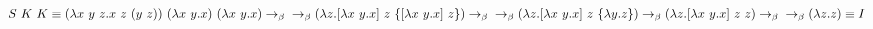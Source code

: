 \documentclass[12pt]{article}
\begin{document}
\large

\noindent
$
S\ K\ K \equiv
(\lambda x\ y\ z.x\ z\ (y\ z))\ (\lambda x\ y.x)\ (\lambda x\ y.x) \rightarrow_\beta \\
\rightarrow_\beta (\lambda z.[\lambda x\ y.x]\ z\ \{[\lambda x\ y.x]\ z\}) \rightarrow_\beta \\
\rightarrow_\beta (\lambda z.[\lambda x\ y.x]\ z\ \{\lambda y.z\}) \rightarrow_\beta (\lambda z.[\lambda x\ y.x]\ z\ z) \rightarrow_\beta \\
\rightarrow_\beta (\lambda z. z) \equiv I
$
\end{document}
